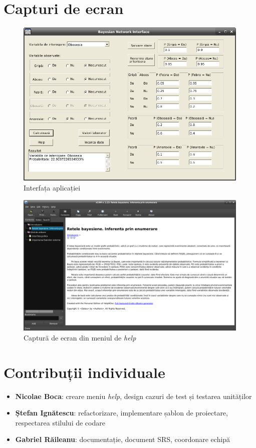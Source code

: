 \documentclass[12pt]{article}
\begin{document}
\section{Capturi de ecran}
	\begin{figure}[!h]
		\centering
		\includegraphics [scale=0.5] {img/gui.png}
		\caption{Interfața aplicației}
	\end{figure}
	\begin{figure}[!h]
	\centering
	\includegraphics [scale=0.3] {img/help.png}
	\caption{Captură de ecran din meniul de \textit{help}}
\end{figure}
\section{Contribuții individuale}
\begin{itemize}
	\item \textbf{Nicolae Boca}: creare meniu \textit{help}, design cazuri de test și testarea unităților
	\item \textbf{Ștefan Ignătescu}: refactorizare, implementare șablon de proiectare, respectarea stilului de codare
	\item \textbf{Gabriel Răileanu}: documentație, document SRS, coordonare echipă
\end{itemize}

\end{document}
